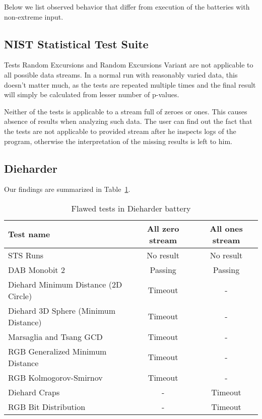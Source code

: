 \documentclass[
  digital,  	%
  color,		%
  oneside,   	%
  12pt,
  nocover,
  notable,
  nolof,
  nolot,
]{fithesis3}
\begin{document}
Below we list observed behavior that differ from execution of the batteries with non-extreme input.

\subsection*{NIST Statistical Test Suite}
Tests Random Excursions and Random Excursions Variant are not applicable to all possible data streams. In a normal run with reasonably varied data, this doesn't matter much, as the tests are repeated multiple times and the final result will simply be calculated from lesser number of p-values. 

Neither of the tests is applicable to a stream full of zeroes or ones. This causes absence of results when analyzing such data. The user can find out the fact that the tests are not applicable to provided stream after he inspects logs of the program, otherwise the interpretation of the missing results is left to him.

\subsection*{Dieharder}
Our findings are summarized in Table~\ref{tab:dieharder-errors}.

\begin{table}[h!]
\begin{nomar}
\centering
\begin{tabular}{ l || c | c }
\textbf{Test name}                   & \textbf{All zero stream} & \textbf{All ones stream} \\ \hline \hline
STS Runs                             & No result                & No result                \\ \hline
DAB Monobit 2 						 & Passing                  & Passing                  \\ \hline
Diehard Minimum Distance (2D Circle) & Timeout                  & -                        \\
Diehard 3D Sphere (Minimum Distance) & Timeout                  & -                        \\
Marsaglia and Tsang GCD              & Timeout                  & -                        \\
RGB Generalized Minimum Distance     & Timeout                  & -                        \\
RGB Kolmogorov-Smirnov               & Timeout                  & -                        \\  
Diehard Craps                        & -                        & Timeout                  \\
RGB Bit Distribution                 & -                        & Timeout                  \\
\end{tabular}
\end{nomar}
\caption{Flawed tests in Dieharder battery}
\label{tab:dieharder-errors}
\end{table}
\end{document}

